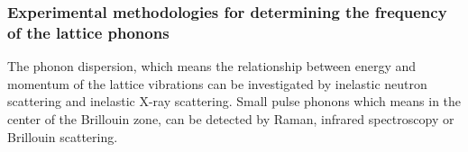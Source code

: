 \subsubsection*{Experimental methodologies for determining the frequency of the lattice phonons}

The phonon dispersion, which means the relationship between energy and momentum of the 
lattice vibrations can be investigated by inelastic neutron scattering and inelastic 
X-ray scattering. Small pulse phonons which means in the center of the Brillouin zone, 
can be detected by Raman, infrared spectroscopy or Brillouin scattering.


